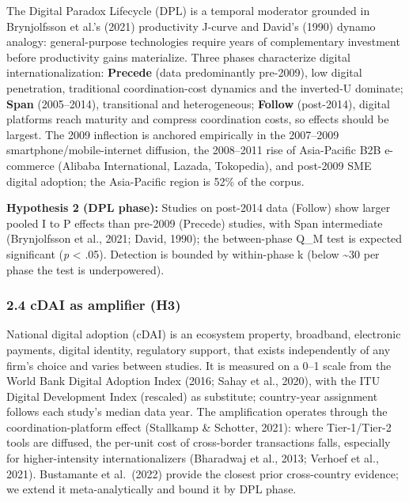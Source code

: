 \documentclass[
  12pt,a4paper]{article}
\begin{document}
The Digital Paradox Lifecycle (DPL) is a temporal moderator grounded in
Brynjolfsson et al.'s (2021) productivity J-curve and David's (1990)
dynamo analogy: general-purpose technologies require years of
complementary investment before productivity gains materialize. Three
phases characterize digital internationalization: \textbf{Precede} (data
predominantly pre-2009), low digital penetration, traditional
coordination-cost dynamics and the inverted-U dominate; \textbf{Span}
(2005--2014), transitional and heterogeneous; \textbf{Follow}
(post-2014), digital platforms reach maturity and compress coordination
costs, so effects should be largest. The 2009 inflection is anchored
empirically in the 2007--2009 smartphone/mobile-internet diffusion, the
2008--2011 rise of Asia-Pacific B2B e-commerce (Alibaba International,
Lazada, Tokopedia), and post-2009 SME digital adoption; the Asia-Pacific
region is 52\% of the corpus.

\textbf{Hypothesis 2 (DPL phase):} Studies on post-2014 data (Follow)
show larger pooled I to P effects than pre-2009 (Precede) studies, with
Span intermediate (Brynjolfsson et al., 2021; David, 1990); the
between-phase Q\_M test is expected significant (\emph{p} \textless{}
.05). Detection is bounded by within-phase k (below \textasciitilde30
per phase the test is underpowered).

\hypertarget{cdai-as-amplifier-h3}{%
\subsubsection{2.4 cDAI as amplifier (H3)}\label{cdai-as-amplifier-h3}}

National digital adoption (cDAI) is an ecosystem property, broadband,
electronic payments, digital identity, regulatory support, that exists
independently of any firm's choice and varies between studies. It is
measured on a 0--1 scale from the World Bank Digital Adoption Index
(2016; Sahay et al., 2020), with the ITU Digital Development Index
(rescaled) as substitute; country-year assignment follows each study's
median data year. The amplification operates through the
coordination-platform effect (Stallkamp \& Schotter, 2021): where
Tier-1/Tier-2 tools are diffused, the per-unit cost of cross-border
transactions falls, especially for higher-intensity internationalizers
(Bharadwaj et al., 2013; Verhoef et al., 2021). Bustamante et al.~(2022)
provide the closest prior cross-country evidence; we extend it
meta-analytically and bound it by DPL phase.
\end{document}
